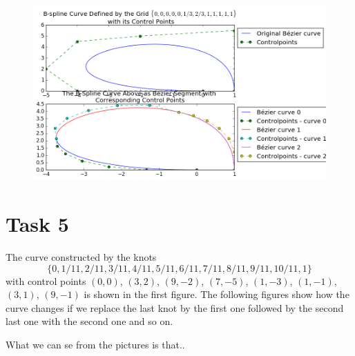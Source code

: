 \documentclass[]{article}
\begin{document}
\begin{figure}[h!]
	\includegraphics[scale=0.5]{task4}
\end{figure}

\section*{Task 5}
The curve constructed by the knots $$\{0,1/11,2/11,3/11,4/11,5/11,6/11,7/11,8/11,9/11,10/11,1\}$$ with control points $(0,0)$, $(3,2)$, $(9,-2)$, $(7,-5)$, $(1,-3)$, $(1,-1)$, $(3,1)$, $(9,-1)$ is shown in the first figure. The following figures show how the curve changes if we replace the last knot by the first one followed by the second last one with the second one and so on. 

What we can se from the pictures is that..

\begin{figure}[h!]
\end{figure}
\end{document}
